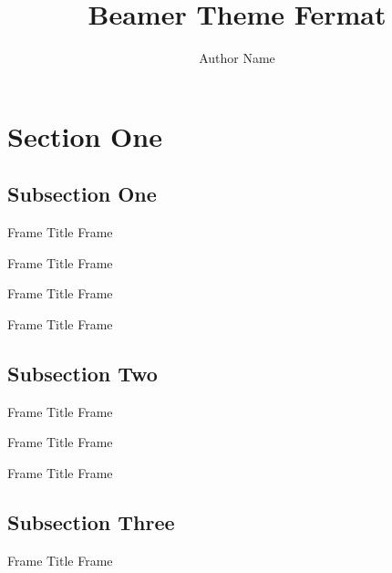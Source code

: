 \documentclass[12pt,xcolor={rgb}]{beamer}
\begin{document}
\title{Beamer Theme Fermat}
\author{Author Name}

\begin{frame}[plain]
\titlepage
\end{frame}

\section{Section One}

\subsection{Subsection One}

\begin{frame}{Frame Title}
Frame \insertframenumber
\end{frame}

\begin{frame}{Frame Title}
Frame \insertframenumber
\end{frame}

\begin{frame}{Frame Title}
Frame \insertframenumber
\end{frame}

\begin{frame}{Frame Title}
Frame \insertframenumber
\end{frame}

\subsection{Subsection Two}

\begin{frame}{Frame Title}
Frame \insertframenumber
\end{frame}

\begin{frame}{Frame Title}
Frame \insertframenumber
\end{frame}

\begin{frame}{Frame Title}
Frame \insertframenumber
\end{frame}

\subsection{Subsection Three}

\begin{frame}{Frame Title}
Frame \insertframenumber
\end{frame}
\end{document}
